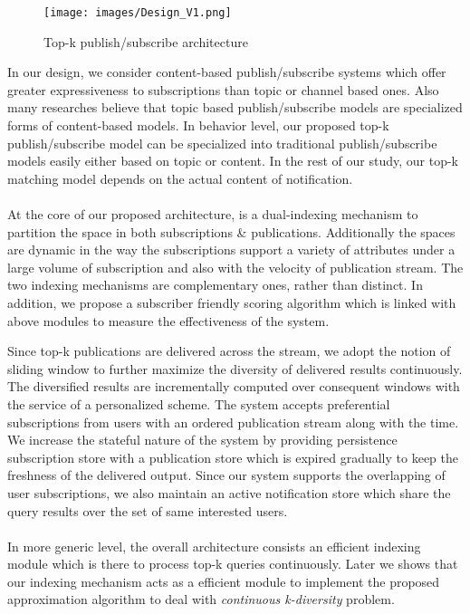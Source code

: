 \documentclass[a4paper,12pt,oneside]{book}
\theoremstyle{definition}
\theoremstyle{remark}
\begin{document}
\begin{figure}[h]
\begin{center}
\texttt{[image: images/Design\_V1.png]}
\caption{Top-k publish/subscribe architecture}
\label{our_pub_sub_architecture}
\end{center}
\end{figure}

In our design, we consider content-based publish/subscribe systems which offer greater expressiveness to subscriptions than topic or channel based ones. Also many researches believe that topic based publish/subscribe models are specialized forms of content-based models. In behavior level, our proposed top-k publish/subscribe model can be specialized into traditional publish/subscribe models easily either based on topic or content. In the rest of our study, our top-k matching model depends on the actual content of notification.
\paragraph*{}    
At the core of our proposed architecture, is a dual-indexing mechanism to partition the space in both subscriptions \& publications. Additionally the spaces are dynamic in the way the subscriptions support a variety of attributes under a large volume of subscription and also with the velocity of publication stream. The two indexing mechanisms are complementary ones, rather than distinct. In addition, we propose a subscriber friendly scoring algorithm which is linked with above modules to measure the effectiveness of the system.  

Since top-k publications are delivered across the stream, we adopt the notion of sliding window to further maximize the diversity of delivered results continuously. The diversified results are incrementally computed over consequent windows with the service of a personalized scheme. The system accepts preferential subscriptions from users with an ordered publication stream along with the time. We increase the stateful nature of the system by providing persistence subscription store with a publication store which is expired gradually to keep the freshness of the delivered output. Since our system supports the overlapping of user subscriptions, we also maintain an active notification store which share the query results over the set of same interested users.

\paragraph*{}
In more generic level, the overall architecture consists an efficient indexing module which is there to process top-k queries continuously. Later we shows that our indexing mechanism acts as a efficient module to implement the proposed approximation algorithm to deal with \emph{continuous k-diversity} problem.
\end{document}
